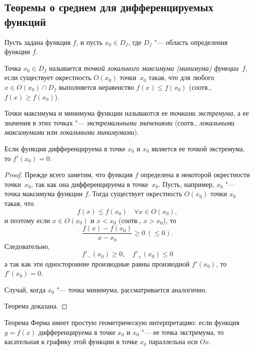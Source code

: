 \subsection{Теоремы о среднем для дифференцируемых функций}
Пусть задана функция $f$, и пусть $x_0 \in D_f$, где $D_f$ "--- область определения функции $f$.
\begin{defn}
Точка $x_0 \in D_f$ называется \textit{точкой локального максимума (минимума) функции}~$f$, если существует окрестность $O(x_0)$ точки~$x_0$ такая, что для любого $x \in O(x_0)\cap D_f$ выполняется неравенство $f(x) \le f(x_0)$ (соотв., $f(x) \ge f(x_0)$).
\end{defn}
\begin{defn} Точки максимума и минимума функции называются ее \textit{точками экстремума}, а ее значения в этих точках "--- \textit{экстремальными значениями} (соотв., \textit{локальными максимумами} или \textit{локальными минимумами}).
\end{defn}
\begin{thm}\label{ch4n1} 
Если функция дифференцируема в точке $x_0$ и $x_0$ является ее точкой экстремума, то $f'(x_0) = 0$.
\end{thm}
\begin{proof}
Прежде всего заметим, что функция $f$ определена в некоторой окрестности точки~$x_0$, так как она дифференцируема в точке~$x_0$. Пусть, например, $x_0$ "--- точка максимума функции $f$. Тогда существует окрестность $O(x_0)$ точки $x_0$ такая, что 
$$
f(x) \le f(x_0)\quad \forall x \in O(x_0),
$$
и поэтому если $x \in O(x_0)$ и $x < x_0$ (соотв., $x > x_0$), то
$$
\frac{f(x)-f(x_0)}{x-x_0}\ge0\ (\le 0).
$$
Следовательно,
$$
f'_{-}(x_0)\ge 0, \quad f'_{+}(x_0)\le 0
$$
а так как эти односторонние производные равны производной $f'(x_0)$,
то $f'(x_0) = 0$. 

Случай, когда $x_0$ "--- точка минимума, рассматривается аналогично. 

Теорема доказана.
\end{proof}

Теорема Ферма имеет простую геометрическую интерпретацию:	если функция $y = f(x)$ дифференцируема в точке $x_0$ и $x_0$ "--- ее точка экстремума, то касательная к графику этой функции в точке $x_0$ параллельна оси $Ox$. 

